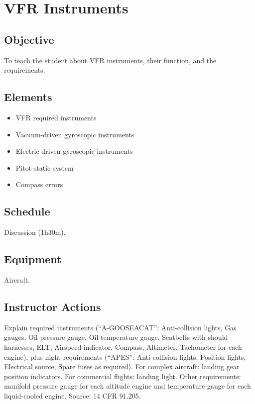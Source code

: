 \section{VFR Instruments}

\subsection{Objective}

To teach the student about VFR instruments, their function, and the
requirements.

\subsection{Elements}

\begin{itemize}
  \item VFR required instruments
  \item Vacuum-driven gyroscopic instruments
  \item Electric-driven gyroscopic instruments
  \item Pitot-static system
  \item Compass errors
\end{itemize}

\subsection{Schedule}

Discussion (1h30m).

\subsection{Equipment}

Aircraft.

\subsection{Instructor Actions}

Explain required instruments (``A-GOOSEACAT'': Anti-collision lights, Gas
gauges, Oil pressure gauge, Oil temperature gauge, Seatbelts with should
harnesses, ELT, Airspeed indicator, Compass, Altimeter, Tachometer for each
engine), plus night requirements (``APES'': Anti-collision lights, Position
lights, Electrical source, Spare fuses as required). For complex aircraft:
landing gear position indicators. For commercial flights: landing light. Other
requirements: manifold pressure gauge for each altitude engine and temperature
gauge for each liquid-cooled engine. Source: 14 CFR 91.205.

